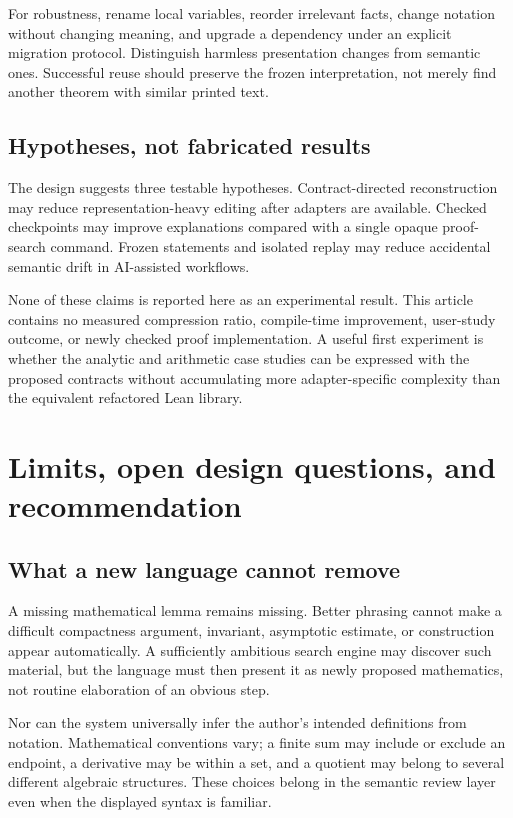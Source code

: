 \documentclass[11pt,a4paper]{article}
\theoremstyle{definition}
\theoremstyle{remark}
\begin{document}
For robustness, rename local variables, reorder irrelevant facts, change notation without changing meaning, and upgrade a dependency under an explicit migration protocol. Distinguish harmless presentation changes from semantic ones. Successful reuse should preserve the frozen interpretation, not merely find another theorem with similar printed text.

\subsection{Hypotheses, not fabricated results}
The design suggests three testable hypotheses. Contract-directed reconstruction may reduce representation-heavy editing after adapters are available. Checked checkpoints may improve explanations compared with a single opaque proof-search command. Frozen statements and isolated replay may reduce accidental semantic drift in AI-assisted workflows.

None of these claims is reported here as an experimental result. This article contains no measured compression ratio, compile-time improvement, user-study outcome, or newly checked proof implementation. A useful first experiment is whether the analytic and arithmetic case studies can be expressed with the proposed contracts without accumulating more adapter-specific complexity than the equivalent refactored Lean library.

\section{Limits, open design questions, and recommendation}
\label{sec:conclusion}
\subsection{What a new language cannot remove}
A missing mathematical lemma remains missing. Better phrasing cannot make a difficult compactness argument, invariant, asymptotic estimate, or construction appear automatically. A sufficiently ambitious search engine may discover such material, but the language must then present it as newly proposed mathematics, not routine elaboration of an obvious step.

Nor can the system universally infer the author's intended definitions from notation. Mathematical conventions vary; a finite sum may include or exclude an endpoint, a derivative may be within a set, and a quotient may belong to several different algebraic structures. These choices belong in the semantic review layer even when the displayed syntax is familiar.
\end{document}
